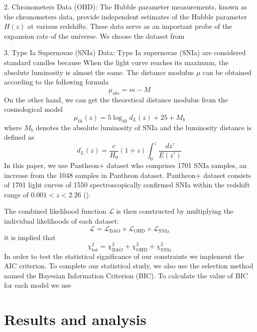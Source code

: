 \documentclass[preprint]{aastex631}
\begin{document}
2. Chronometers Data (OHD): The Hubble parameter measurements, known as the chronometers data, provide independent estimates of the Hubble parameter \(H(z)\) at various redshifts. These data serve as an important probe of the expansion rate of the universe. We choose the dataset from \cite{Favale_2023}

3. Type Ia Supernovae (SNIa) Data: Type Ia supernovae (SNIa) are considered standard candles because When the light curve reaches its maximum, the absolute luminosity is almost the same. The distance modulus $\mu$ can be obtained according to the following formula
\begin{equation}
    \mu_{obs}=m-M
\end{equation}
On the other hand, we can get the theoretical distance modulus from the cosmological model
\begin{equation}
    \mu_{th}(z)=5\log_{10}d_L(z)+25+M_b
\end{equation}
where $M_b$ denotes the absolute luminosity of SNIa and the luminosity distance is defined as
\begin{equation}
    d_L(z)=\frac{c}{H_0}(1+z)\int_0^z \frac{dz'}{E(z')}
\end{equation}
In this paper, we use Pantheon+ dataset who comprises 1701 SNIa samples, an increase from the 1048 samples in Pantheon dataset. Pantheon+ dataset consists of 1701 light curves of 1550 spectroscopically confirmed SNIa within the redshift range of $0.001 < z < 2.26$ (\cite{Scolnic_2022,Brout_2022}).

The combined likelihood function \(\mathcal{L}\) is then constructed by multiplying the individual likelihoods of each dataset:
\begin{equation}
\mathcal{L} = \mathcal{L}_{\text{BAO}} \times \mathcal{L}_{\text{OHD}} \times \mathcal{L}_{\text{SNIa}}
\end{equation}
it is implied that
\begin{equation}
    \chi^2_\text{tot}=\chi^2_{\text{BAO}}+\chi^2_{\text{OHD}} +\chi^2_{\text{SNIa}}
\end{equation}
In order to test the statistical significance of our constraints we implement the AIC criterion.
To complete our statistical study, we also use the selection method named the Bayesian Information Criterion (BIC). To calculate the value of BIC for each model we use




\section{Results and analysis}
\end{document}
